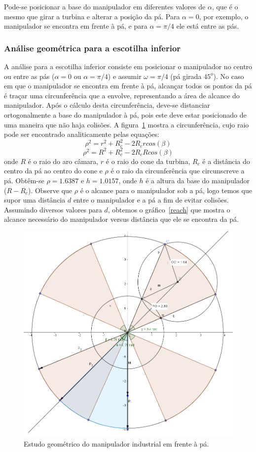 Pode-se posicionar a base do manipulador em diferentes valores de $\alpha$, que é
o mesmo que girar a turbina e alterar a posição da pá. Para $\alpha = 0$, por
exemplo, o manipulador se encontra em frente à pá, e para $\alpha = \pi/4$ ele está entre as pás.

\subsubsection{Análise geométrica para a escotilha inferior}
A análise para a escotilha inferior consiste em posicionar o manipulador no
centro ou entre as pás ($\alpha = 0$ ou $\alpha = \pi/4$) e assumir $\omega =
\pi/4$ (pá girada $45^o$). No caso em que o
manipulador se encontra em frente à pá, alcançar todos os pontos da pá  é
traçar uma circunferência que a envolve, representando
a área de alcance do manipulador. Após o cálculo desta
circunferência, deve-se distanciar ortogonalmente a base do manipulador à pá,
pois este deve estar posicionado de uma maneira que não haja colisões. A
figura~\ref{paemfrente} mostra a circunferência, cujo raio pode ser encontrado
analiticamente pelas equações:
$$\rho ^2 = r^2+R_c^2-2R_crcos(\beta)$$
$$\rho ^2 = R^2+R_c^2-2R_cRcos(\beta)$$
onde $R$ é o raio do aro câmara, $r$ é o raio do cone da turbina, $R_c$ é a
distância do centro da pá ao centro do cone e $\rho$ é o raio da circunferência
que circunscreve a pá. Obtêm-se  $\rho=1.6387$ e $h=1.0157$, onde $h$ é a altura
da base do manipulador ($R-R_c$). Observe que $\rho$ é o alcance para o
manipulador sob a pá, logo temos que supor uma distância $d$ entre o manipulador
e a pá a fim de evitar colisões. Assumindo diversos valores para $d$, obtemos o
gráfico~\ref{reach} que mostra o alcance necessário do manipulador versus
distância que ele se encontra da pá. 

\begin{figure}[h!]
\centering
	\includegraphics[width=\columnwidth]{figs/estudo/geometrico/paemfrente.png} 
	\caption{Estudo geométrico do manipulador industrial em frente à pá.}
	\label{paemfrente}
\end{figure}

